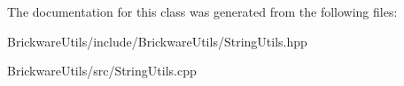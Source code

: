 The documentation for this class was generated from the following files\+:\begin{DoxyCompactItemize}
\item 
Brickware\+Utils/include/\+Brickware\+Utils/String\+Utils.\+hpp\item 
Brickware\+Utils/src/String\+Utils.\+cpp\end{DoxyCompactItemize}
